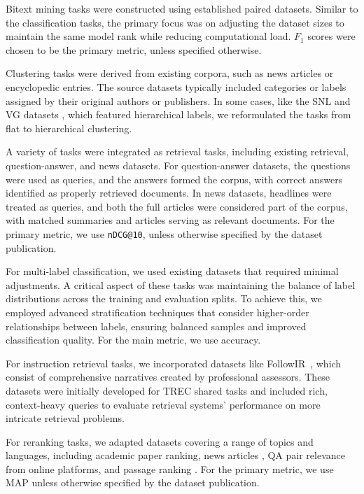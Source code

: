 Bitext mining tasks were constructed using established paired datasets. Similar to the classification tasks, the primary focus was on adjusting the dataset sizes to maintain the same model rank while reducing computational load.
$F_1$ scores were chosen to be the primary metric, unless specified otherwise.

Clustering tasks were derived from existing corpora, such as news articles or encyclopedic entries. The source datasets typically included categories or labels assigned by their original authors or publishers. In some cases, like the SNL and VG datasets \citep{navjord2023beyond}, which featured hierarchical labels, we reformulated the tasks from flat to hierarchical clustering.

A variety of tasks were integrated as retrieval tasks, including existing retrieval, question-answer, and news datasets. For question-answer datasets, the questions were used as queries, and the answers formed the corpus, with correct answers identified as properly retrieved documents. In news datasets, headlines were treated as queries, and both the full articles were considered part of the corpus, with matched summaries and articles serving as relevant documents. For the primary metric, we use \texttt{nDCG@10}, unless otherwise specified by the dataset publication.

For multi-label classification, we used existing datasets that required minimal adjustments. A critical aspect of these tasks was maintaining the balance of label distributions across the training and evaluation splits. To achieve this, we employed advanced stratification techniques \citep{szymanski17a, sechidis2011stratification} that consider higher-order relationships between labels, ensuring balanced samples and improved classification quality. For the main metric, we use accuracy.

For instruction retrieval tasks, we incorporated datasets like FollowIR~\citep{weller2024followir,weller2025mfollowirmultilingualbenchmarkinstruction}, which consist of comprehensive narratives created by professional assessors. These datasets were initially developed for TREC shared tasks and included rich, context-heavy queries to evaluate retrieval systems' performance on more intricate retrieval problems.

For reranking tasks, we adapted datasets covering a range of topics and languages, including academic paper ranking, news articles \citep{wu2020mind}, QA pair relevance from online platforms, and passage ranking \citep{xie2023t2ranking}. For the primary metric, we use MAP unless otherwise specified by the dataset publication.

